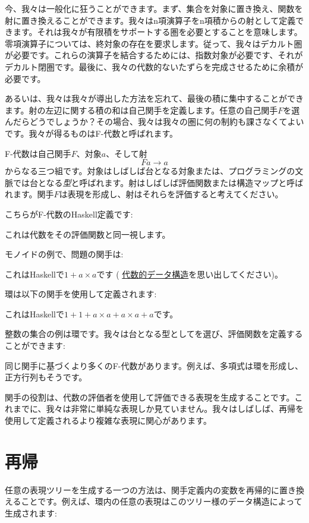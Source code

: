 今、我々は一般化に狂うことができます。まず、集合を対象に置き換え、関数を射に置き換えることができます。我々はn項演算子をn項積からの射として定義できます。それは我々が有限積をサポートする圏を必要とすることを意味します。零項演算子については、終対象の存在を要求します。従って、我々はデカルト圏が必要です。これらの演算子を結合するためには、指数対象が必要です、それがデカルト閉圏です。最後に、我々の代数的ないたずらを完成させるために余積が必要です。

あるいは、我々は我々が導出した方法を忘れて、最後の積に集中することができます。射の左辺に関する積の和は自己関手を定義します。任意の自己関手$F$を選んだらどうでしょうか？その場合、我々は我々の圏に何の制約も課さなくてよいです。我々が得るものはF-代数と呼ばれます。

F-代数は自己関手$F$、対象$a$、そして射
\[F a \to a\]
からなる三つ組です。対象はしばしば台となる対象または、プログラミングの文脈では台となる\emph{型}と呼ばれます。射はしばしば評価関数または構造マップと呼ばれます。関手$F$は表現を形成し、射はそれらを評価すると考えてください。

こちらがF-代数のHaskell定義です: 

これは代数をその評価関数と同一視します。

モノイドの例で、問題の関手は: 

これはHaskellで$1 + a\times{}a$です (
\hyperref[simple-algebraic-data-types]{代数的データ構造}を思い出してください)。

環は以下の関手を使用して定義されます: 

これはHaskellで$1 + 1 + a\times{}a + a\times{}a + a$です。

整数の集合の例は環です。我々は台となる型としてを選び、評価関数を定義することができます: 

同じ関手に基づくより多くのF-代数があります。例えば、多項式は環を形成し、正方行列もそうです。

関手の役割は、代数の評価者を使用して評価できる表現を生成することです。これまでに、我々は非常に単純な表現しか見ていません。我々はしばしば、再帰を使用して定義されるより複雑な表現に関心があります。

\section{再帰}

任意の表現ツリーを生成する一つの方法は、関手定義内の変数を再帰的に置き換えることです。例えば、環内の任意の表現はこのツリー様のデータ構造によって生成されます: 

